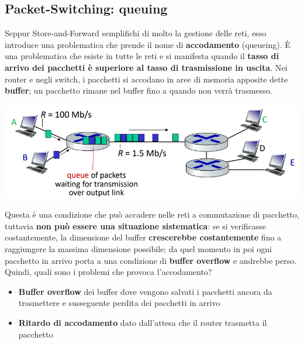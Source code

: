 \documentclass[12pt]{article}
\begin{document}
\subsection{Packet-Switching: queuing}
Seppur Store-and-Forward semplifichi di molto la gestione delle reti, esso introduce una problematica che prende il nome di
\textbf{accodamento} (queueing). È una problematica che esiste in tutte le reti e si manifesta quando il \textbf{tasso di arrivo dei pacchetti è superiore al tasso di trasmissione in uscita}.
Nei router e negli switch, i pacchetti si accodano in aree di memoria apposite dette \textbf{buffer}; un pacchetto rimane nel buffer fino a quando non verrà trasmesso.
\begin{center}
    \includegraphics[width =0.90\linewidth]{Images/7.PNG}
\end{center}
Questa è una condizione che può accadere nelle reti a commutazione di pacchetto, tuttavia \textbf{non può essere una situazione sistematica}:
se si verificasse costantemente, la dimensione del buffer \textbf{crescerebbe costantemente} fino a raggiungere la massima dimensione possibile; da quel momento
in poi ogni pacchetto in arrivo porta a una condizione di \textbf{buffer overflow} e andrebbe perso. Quindi, quali sono i problemi che provoca l'accodamento?
\begin{itemize}
    \item \textbf{Buffer overflow} dei buffer dove vengono salvati i pacchetti ancora da trasmettere e susseguente perdita dei pacchetti in arrivo
    \item \textbf{Ritardo di accodamento} dato dall'attesa che il router trasmetta il pacchetto
\end{itemize}
\end{document}
